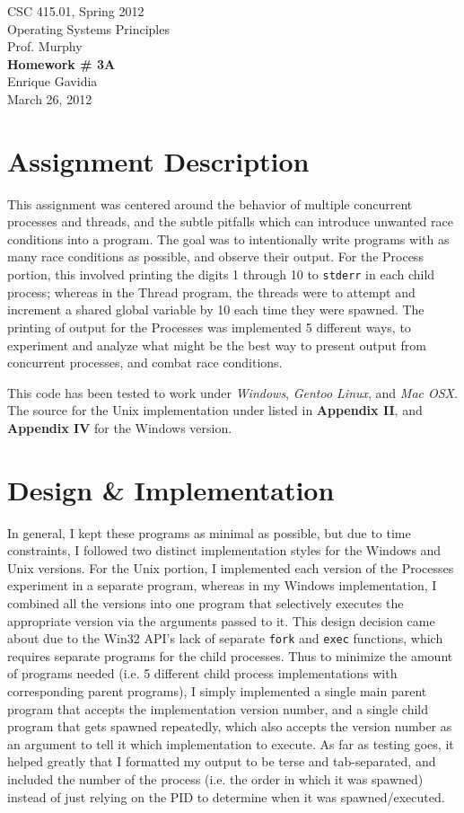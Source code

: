 \documentclass[12pt]{article}
\def \name       {Enrique Gavidia}
\def \coursenum  {CSC 415.01}
\def \coursename {Operating Systems Principles}
\def \instructor {Prof. Murphy}
\def \semester   {Spring 2012}
\def \assignment {Homework \# 3A}
\def \duedate    {March 26, 2012}
\newcommand {\makecover} {
  \begin{titlepage}
    \begin{center}
      \LARGE{\coursenum, \semester \\ \coursename}\\
      \Large{\instructor}\\
      \vfill
      \textbf{\Huge \assignment}\\
      \vfill
      \Large{\name}\\
      \large{\duedate}
    \end{center}
  \end{titlepage}
}
\begin{document}
\makecover

\section*{Assignment Description}
This assignment was centered around the behavior of multiple concurrent processes and threads, and the subtle pitfalls which can introduce
unwanted race conditions into a program. The goal was to intentionally write programs with as many race conditions as possible, and observe
their output. For the Process portion, this involved printing the digits 1 through 10 to \texttt{stderr} in each child process; whereas in
the Thread program, the threads were to attempt and increment a shared global variable by 10 each time they were spawned. The printing of 
output for the Processes was implemented 5 different ways, to experiment and analyze what might be the best way to present output from
concurrent processes, and combat race conditions.

This code has been tested to work under \textsl{Windows}, \textsl{Gentoo Linux}, and \textsl{Mac OSX}.
The source for the Unix implementation under listed in \textbf{Appendix II}, and \textbf{Appendix IV} for the Windows version.

\section*{Design \& Implementation}
In general, I kept these programs as minimal as possible, but due to time constraints, I followed two distinct implementation styles for the 
Windows and Unix versions. For the Unix portion, I implemented each version of the Processes experiment in a separate program,
whereas in my Windows implementation, I combined all the versions into one program that selectively executes the appropriate version via the
arguments passed to it.  This design decision came about due to the Win32 API's lack of separate \texttt{fork} and \texttt{exec} functions,
which requires separate programs for the child processes. Thus to minimize the amount of programs needed (i.e. 5 different child process implementations
with corresponding parent programs), I simply implemented a single main parent program that accepts the implementation version number, and a single child 
program that gets spawned repeatedly, which also accepts the version number as an argument to tell it which implementation to execute.  As far as testing
goes, it helped greatly that I formatted my output to be terse and tab-separated, and included the number of the process (i.e. the order in which it was
spawned) instead of just relying on the PID to determine when it was spawned/executed.
\end{document}
